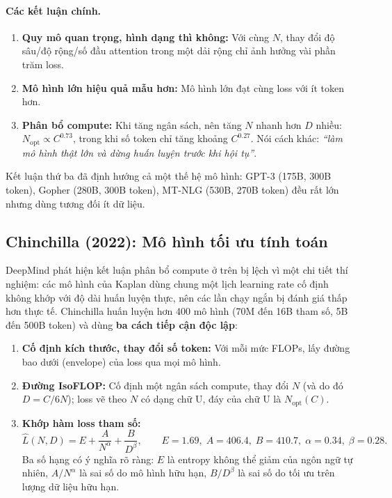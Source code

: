 \paragraph{Các kết luận chính.}
\begin{enumerate}
	\item \textbf{Quy mô quan trọng, hình dạng thì không:} Với cùng $N$, thay đổi độ sâu/độ rộng/số đầu attention trong một dải rộng chỉ ảnh hưởng vài phần trăm loss.
	\item \textbf{Mô hình lớn hiệu quả mẫu hơn:} Mô hình lớn đạt cùng loss với ít token hơn.
	\item \textbf{Phân bổ compute:} Khi tăng ngân sách, nên tăng $N$ nhanh hơn $D$ nhiều: $N_{\text{opt}} \propto C^{0.73}$, trong khi số token chỉ tăng khoảng $C^{0.27}$. Nói cách khác: \emph{“làm mô hình thật lớn và dừng huấn luyện trước khi hội tụ”}.
\end{enumerate}
Kết luận thứ ba đã định hướng cả một thế hệ mô hình: GPT-3 (175B, 300B token), Gopher (280B, 300B token), MT-NLG (530B, 270B token) đều rất lớn nhưng dùng tương đối ít dữ liệu.

\subsection{Chinchilla (2022): Mô hình tối ưu tính toán}
\label{ssec:chinchilla}
DeepMind \cite{hoffmann2022chinchilla} phát hiện kết luận phân bổ compute ở trên bị lệch vì một chi tiết thí nghiệm: các mô hình của Kaplan dùng chung một lịch learning rate cố định không khớp với độ dài huấn luyện thực, nên các lần chạy ngắn bị đánh giá thấp hơn thực tế. Chinchilla huấn luyện hơn 400 mô hình (70M đến 16B tham số, 5B đến 500B token) và dùng \textbf{ba cách tiếp cận độc lập}:
\begin{enumerate}
	\item \textbf{Cố định kích thước, thay đổi số token:} Với mỗi mức FLOPs, lấy đường bao dưới (envelope) của loss qua mọi mô hình.
	\item \textbf{Đường IsoFLOP:} Cố định một ngân sách compute, thay đổi $N$ (và do đó $D = C/6N$); loss vẽ theo $N$ có dạng chữ U, đáy của chữ U là $N_{\text{opt}}(C)$.
	\item \textbf{Khớp hàm loss tham số:}
	\begin{equation}
		\hat{L}(N, D) = E + \frac{A}{N^{\alpha}} + \frac{B}{D^{\beta}}, \qquad E = 1.69,\; A = 406.4,\; B = 410.7,\; \alpha = 0.34,\; \beta = 0.28.
		\label{eq:chinchilla_loss}
	\end{equation}
	Ba số hạng có ý nghĩa rõ ràng: $E$ là entropy không thể giảm của ngôn ngữ tự nhiên, $A/N^\alpha$ là sai số do mô hình hữu hạn, $B/D^\beta$ là sai số do tối ưu trên lượng dữ liệu hữu hạn.
\end{enumerate}

